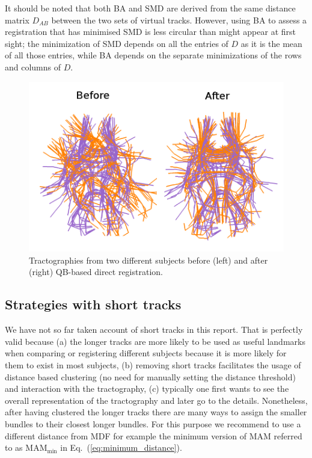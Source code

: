 \documentclass[journal]{IEEEtran}
\begin{document}
It should be noted that both BA and SMD are derived from the same
distance matrix $D_{AB}$ between the two sets of virtual
tracks. However, using BA to assess a registration that has minimised
SMD is less circular than might appear at first sight; the minimization
of SMD depends on all the entries of $D$ as it is the mean of all those
entries, while BA depends on the separate minimizations of the rows and
columns of $D$.

\begin{figure}
\begin{centering}
\includegraphics[scale=1.0]{Fig_9_QB_registration2_only_landscape}
\par\end{centering}
\caption{Tractographies from two different subjects
  before (left) and after (right) QB-based direct registration.\label{Flo:direct_registration}}
\end{figure}

\subsection{Strategies with short tracks}

We have not so far taken account of short tracks in this report. That
is perfectly valid because (a) the longer tracks are more likely to
be used as useful landmarks when comparing or registering different
subjects because it is more likely for them to exist in most subjects,
(b) removing short tracks facilitates the usage of distance based
clustering (no need for manually setting the distance threshold) and
interaction with the tractography, (c) typically one first wants to
see the overall representation of the tractography and later go to
the details. Nonetheless, after having clustered the longer tracks
there are many ways to assign the smaller bundles to their closest
longer bundles. For this purpose we recommend to use a different distance
from MDF for example the minimum version of MAM referred
to as $\textrm{MAM}_{\textrm{min}}$ in Eq.~(\ref{eq:minimum_distance}). 
\end{document}

